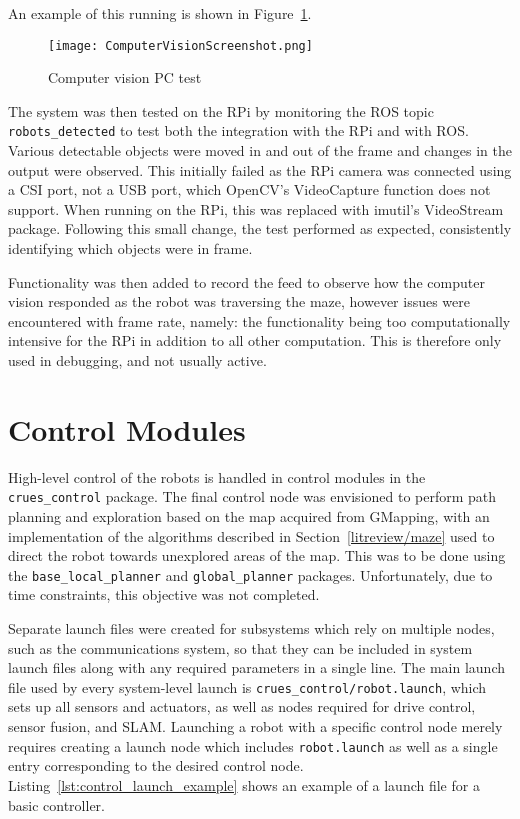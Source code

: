 \noindent
An example of this running is shown in Figure~\ref{fig:cv_screenshot}.

\begin{figure}[!ht]
	\centering
	\texttt{[image: ComputerVisionScreenshot.png]}
	\caption{Computer vision PC test}\label{fig:cv_screenshot}
\end{figure}

The system was then tested on the RPi by monitoring the ROS topic \verb|robots_detected| to
test both the integration with the RPi and with ROS. Various detectable objects were moved in
and out of the frame and changes in the output were observed. This initially failed as the RPi
camera was connected using a CSI port, not a USB port, which OpenCV's VideoCapture function
does not support. When running on the RPi, this was replaced with imutil's VideoStream package.
Following this small change, the test performed as expected, consistently identifying which
objects were in frame.

Functionality was then added to record the feed to observe how the computer vision responded as
the robot was traversing the maze, however issues were encountered with frame rate, namely:
the functionality being too computationally intensive for the RPi in addition to all other
computation. This is therefore only used in debugging, and not usually active.

\section{Control Modules}\label{soft/control}

High-level control of the robots is handled in control modules in the
\verb|crues_control| package. The final control node was envisioned to perform
path planning and exploration based on the map acquired from GMapping, with an
implementation of the algorithms described in Section~\ref{litreview/maze} used
to direct the robot towards unexplored areas of the map. This was to be done
using the \verb|base_local_planner| and \verb|global_planner| packages.
Unfortunately, due to time constraints, this objective was not completed.

Separate launch files were created for subsystems which rely on multiple nodes,
such as the communications system, so that they can be included in system launch
files along with any required parameters in a single line. The main launch file
used by every system-level launch is \verb|crues_control/robot.launch|, which
sets up all sensors and actuators, as well as nodes required for drive control,
sensor fusion, and SLAM. Launching a robot with a specific control node
merely requires creating a launch node which includes \verb|robot.launch| as
well as a single entry corresponding to the desired control node.
Listing~\ref{lst:control_launch_example} shows an example of a launch file for
a basic controller.

